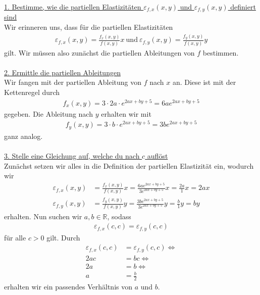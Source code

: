 \underline{1. Bestimme, wie die partiellen Elastizitäten $\varepsilon_{f,x}(x,y)$ und $\varepsilon_{f,y}(x,y)$ definiert sind }\\
Wir erinneren uns, dass für die partiellen Elastizitäten
\begin{align*}
\varepsilon_{f,x}(x,y) =  \frac{f_x(x,y)}{f(x,y)}x
\ \text{und} \
\varepsilon_{f,y}(x,y) =  \frac{f_y(x,y)}{f(x,y)}y
\end{align*}
gilt. Wir müssen also zunächst die partiellen Ableitungen von $f$ bestimmen.\\ 
\\
\underline{2. Ermittle die partiellen Ableitungen}\\
Wir fangen mit der partiellen Ableitung von $f$ nach $x$ an.
Diese ist mit der Kettenregel durch
\begin{align*}
f_x(x,y) = 3 \cdot 2a \cdot e^{2ax + by +5}
= 6a e^{2ax + by +5}
\end{align*}
gegeben. Die Ableitung nach $y$ erhalten wir mit
\begin{align*}
f_y(x,y) = 3 \cdot b \cdot e^{2ax + by +5}
= 3b e^{2ax + by +5}
\end{align*}
ganz analog.\\
\\
\underline{3. Stelle eine Gleichung auf, welche du nach $c$ auflöst}\\
Zunächst setzen wir alles in die Definition der partiellen Elastizität ein, wodurch wir
\begin{align*}
\varepsilon_{f,x}(x,y) 
&=  \frac{f_x(x,y)}{f(x,y)}x
=  \frac{6a e^{2ax+by+5}}{3e^{2ax+by+5}}x
=  \frac{2a}{1}x = 2ax\\
\varepsilon_{f,y}(x,y)
&=  \frac{f_y(x,y)}{f(x,y)}y
= \frac{3b e^{2ax+by+5}}{3 e^{2ax+by+5}}y
=  \frac{b}{1}y = by
\end{align*}
erhalten.
Nun suchen wir $a,b \in \mathbb{R}$, sodass 
\begin{align*}
\varepsilon_{f,x}(c,c) = \varepsilon_{f,y}(c,c) 
\end{align*}
für alle $c >0 $ gilt.
Durch
\begin{align*}
\varepsilon_{f,x}(c,c) &= \varepsilon_{f,y}(c,c)
\Leftrightarrow\\
2ac &= bc
\Leftrightarrow\\
2a &= b
\Leftrightarrow\\
a &= \frac{b}{2}
\end{align*}
erhalten wir ein passendes Verhältnis von $a$ und $b$.

\newpage
